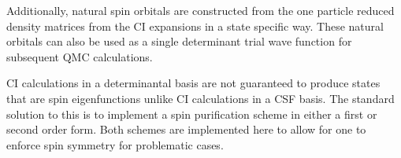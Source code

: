 Additionally, natural spin orbitals are constructed from the one particle reduced density matrices from the CI expansions in a state specific way.
These natural orbitals can also be used as a single determinant trial wave function for subsequent QMC calculations.

CI calculations in a determinantal basis are not guaranteed to produce states that are spin eigenfunctions unlike CI calculations in a CSF basis.
The standard solution to this is to implement a spin purification scheme in either a first or second order form.\citehere
Both schemes are implemented here to allow for one to enforce spin symmetry for problematic cases.



% 
% 

